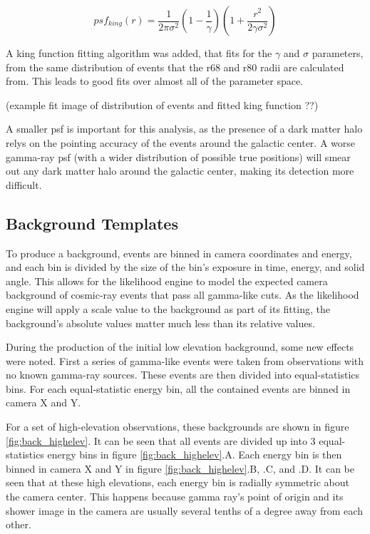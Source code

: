 $$ psf_{king}(r) = \frac{1}{2 \pi \sigma^{2} } \left( 1 - \frac{1}{\gamma} \right) \left( 1 + \frac{ r^{2} }{ 2 \gamma \sigma^{2} } \right) $$

A king function fitting algorithm was added, that fits for the $\gamma$ and $\sigma$ parameters, from the same distribution of events that the r68 and r80 radii are calculated from.
This leads to good fits over almost all of the parameter space.

(example fit image of distribution of events and fitted king function ??)

A smaller psf is important for this analysis, as the presence of a dark matter halo relys on the pointing accuracy of the events around the galactic center.
A worse gamma-ray psf (with a wider distribution of possible true positions) will smear out any dark matter halo around the galactic center, making its detection more difficult.


\subsection{Background Templates}

To produce a background, events are binned in camera coordinates and energy, and each bin is divided by the size of the bin's exposure in time, energy, and solid angle.
This allows for the likelihood engine to model the expected camera background of cosmic-ray events that pass all gamma-like cuts.
As the likelihood engine will apply a scale value to the background as part of its fitting, the background's absolute values matter much less than its relative values.

During the production of the initial low elevation background, some new effects were noted.
First a series of gamma-like events were taken from observations with no known gamma-ray sources.
These events are then divided into equal-statistics bins.
For each equal-statistic energy bin, all the contained events are binned in camera X and Y.

For a set of high-elevation observations, these backgrounds are shown in figure \ref{fig:back_highelev}.
It can be seen that all events are divided up into 3 equal-statistics energy bins in figure \ref{fig:back_highelev}.A.
Each energy bin is then binned in camera X and Y in figure \ref{fig:back_highelev}.B, .C, and .D.
It can be seen that at these high elevations, each energy bin is radially symmetric about the camera center.
This happens because gamma ray's point of origin and its shower image in the camera are usually several tenths of a degree away from each other.

